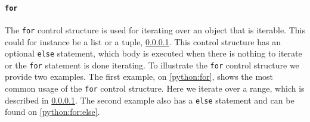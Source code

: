 \paragraph{\texttt{for}}
The \texttt{for} control structure is used for iterating over an object that is iterable.
This could for instance be a list or a tuple, \cref{}.
This control structure has an optional \texttt{else} statement, which body is executed when there is nothing to iterate or the \texttt{for} statement is done iterating.
To illustrate the \texttt{for} control structure we provide two examples.
The first example, on \cref{python:for}, shows the most common usage of the \texttt{for} control structure.
Here we iterate over a range, which is described in \cref{}. 
The second example also has a \texttt{else} statement and can be found on \cref{python:for:else}.


